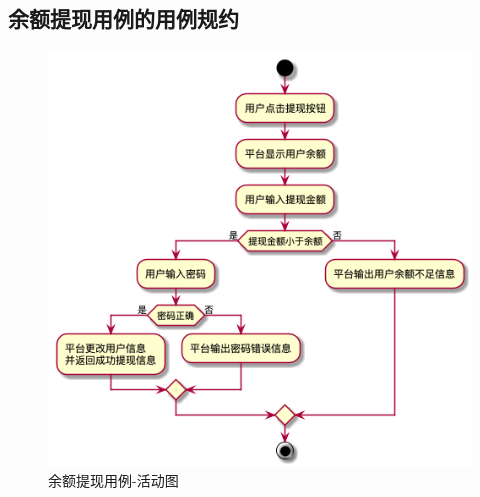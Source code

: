\subsection{余额提现用例的用例规约}
\begin{figure}[htp]
    \centering
    \includegraphics[width=12cm]{report/figure/usecase_v2/withdraw.png}
    \caption{余额提现用例-活动图}
    \label{fig:withdraw}
\end{figure}



